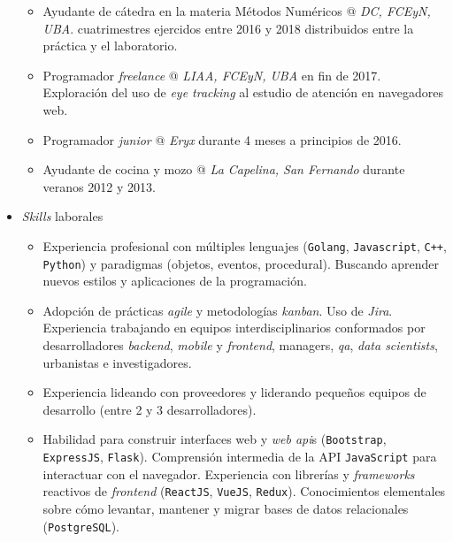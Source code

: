 \documentclass[a4paper]{article}
\begin{document}
\begin{itemize}
\begin{itemize}
    \item
      Ayudante de cátedra en la materia Métodos Numéricos @ \textit{DC, FCEyN,
      UBA}.   cuatrimestres ejercidos entre 2016 y 2018 distribuidos entre la
      práctica y el laboratorio.

    \item
      Programador \textit{freelance} @ \textit{LIAA, FCEyN, UBA} en fin de 2017.
      \newline
      Exploración del uso de \textit{eye tracking} al estudio de atención en
      navegadores web.

    \item
      Programador \textit{junior} @ \textit{Eryx} durante 4 meses a principios
      de 2016.

    \item
      Ayudante de cocina y mozo @ \textit{La Capelina, San Fernando} durante
      veranos 2012 y 2013.

  \end{itemize}

  \item \textit{Skills} laborales
  \begin{itemize}

    \item
      Experiencia profesional con múltiples lenguajes (\texttt{Golang},
      \texttt{Javascript}, \texttt{C}\verb|++|, \texttt{Python}) y paradigmas
      (objetos, eventos, procedural). \newline
      Buscando aprender nuevos estilos y aplicaciones de la programación.

    \item
      Adopción de prácticas \textit{agile} y metodologías \textit{kanban}.
      Uso de \textit{Jira}. \newline
      Experiencia trabajando en equipos interdisciplinarios conformados por
      desarrolladores \textit{backend}, \textit{mobile} y \textit{frontend},
      managers, \textit{qa}, \textit{data scientists}, urbanistas e
      investigadores.

    \item
	  Experiencia lideando con proveedores y liderando pequeños equipos de
      desarrollo (entre 2 y 3 desarrolladores).

    \item
      Habilidad para construir interfaces web y \textit{web api}s
      (\texttt{Bootstrap}, \newline \texttt{ExpressJS}, \texttt{Flask}).
      \newline
      Comprensión intermedia de la API \texttt{JavaScript} para interactuar con
      el navegador. \newline
      Experiencia con librerías y \textit{frameworks} reactivos de
      \textit{frontend} (\texttt{ReactJS}, \texttt{VueJS},
      \texttt{Redux}).\newline
      Conocimientos elementales sobre cómo levantar, mantener y migrar bases de
      datos relacionales (\texttt{PostgreSQL}).


\end{itemize}
\end{itemize}
\end{document}
